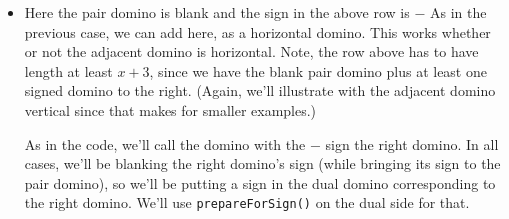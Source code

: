 \documentclass[12pt]{article}
\numberwithin{equation}{section}
\newcommand{\verticalDominoMaybeShift}[4]{\filldraw [dominoMaybeStyle] (#2 - 1 + #4 + \eps,  #1 - 1 + \eps) rectangle + (1 - \teps,2 -\teps) node [dominoText] {$#3$};}
\begin{document}
\begin{itemize}
\begin{itemize}
\begin{figure}[H]
      \end{figure}
      \begin{figure}[H]
        \centering
      \end{figure}
    \end{itemize}
    \item Here the pair domino is blank and the sign in the above row is $-$
    As in the previous case, we can add here, as a horizontal domino.
    This works whether or not the adjacent domino is horizontal.
    Note, the row above has to have length at least $x + 3$, since we have the blank pair domino plus at least one signed domino to the right.
    (Again, we'll illustrate with the adjacent domino vertical since that makes for smaller examples.)

    As in the code, we'll call the domino with the $-$ sign the right domino.
    In all cases, we'll be blanking the right domino's sign (while bringing its sign to the pair domino), so we'll be putting a sign in the dual domino corresponding to the right domino.
    We'll use \texttt{prepareForSign()} on the dual side for that.


\end{itemize}
\end{document}
